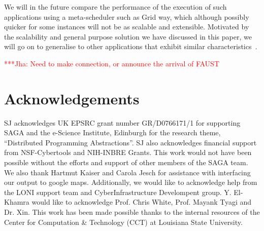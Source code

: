 \documentclass[conference,final]{IEEEtran}
\newcommand{\jhanote}[1]{ {\textcolor{red} { ***Jha: #1 }}}
\begin{document}
We will in the future compare the performance of the execution of such
applications using a meta-scheduler such as Grid way, which although
possibly quicker for some instances will not be as scalable and
extensible. Motivated by the scalability and general purpose solution
we have discussed in this paper, we will go on to generalise to other
applications that exhibit similar characteristics~\cite{nature99}.

\jhanote{Need to make connection, or announce the arrival of FAUST}









\section{Acknowledgements}
SJ acknowledges UK EPSRC grant number GR/D0766171/1 for supporting
SAGA and the e-Science Institute, Edinburgh for the research theme,
``Distributed Programming Abstractions''.  SJ also acknowledges
financial support from NSF-Cybertools and NIH-INBRE Grants. This work
would not have been possible without the efforts and support of other
members of the SAGA team.  We also thank Hartmut Kaiser and Carola
Jesch for assistance with interfacing our output to google
maps. Additionally, we would like to acknowledge help from the LONI
support team and CyberInfrastructure Develompent group.  Y. El-Khamra
would like to acknowledge Prof. Chris White, Prof. Mayank Tyagi and
Dr. Xin. This work has been made possible thanks to the internal
resources of the Center for Computation \& Technology (CCT) at
Louisiana State University.  



\end{document}
